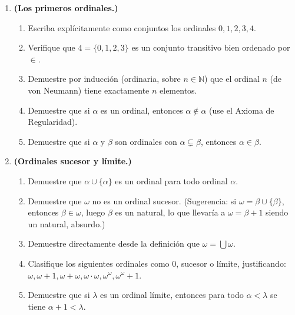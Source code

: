 \begin{enumerate}[leftmargin=2.5em, label=\textbf{\arabic*.}]
  \item \textbf{(Los primeros ordinales.)}
  \begin{enumerate}[label=(\alph*)]
    \item Escriba explícitamente como conjuntos los ordinales $0, 1, 2, 3, 4$.
    \item Verifique que $4 = \{0, 1, 2, 3\}$ es un conjunto transitivo bien ordenado por $\in$.
    \item Demuestre por inducción (ordinaria, sobre $n \in \mathbb{N}$) que el ordinal $n$ (de von Neumann) tiene exactamente $n$ elementos.
    \item Demuestre que si $\alpha$ es un ordinal, entonces $\alpha \notin \alpha$ (use el Axioma de Regularidad).
    \item Demuestre que si $\alpha$ y $\beta$ son ordinales con $\alpha \subsetneq \beta$, entonces $\alpha \in \beta$.
  \end{enumerate}

  \item \textbf{(Ordinales sucesor y límite.)}
  \begin{enumerate}[label=(\alph*)]
    \item Demuestre que $\alpha \cup \{\alpha\}$ es un ordinal para todo ordinal $\alpha$.
    \item Demuestre que $\omega$ no es un ordinal sucesor. (Sugerencia: si $\omega = \beta \cup \{\beta\}$, entonces $\beta \in \omega$, luego $\beta$ es un natural, lo que llevaría a $\omega = \beta+1$ siendo un natural, absurdo.)
    \item Demuestre directamente desde la definición que $\omega = \bigcup \omega$.
    \item Clasifique los siguientes ordinales como $0$, sucesor o límite, justificando: $\omega, \omega+1, \omega+\omega, \omega\cdot\omega, \omega^{\omega}, \omega^{\omega}+1$.
    \item Demuestre que si $\lambda$ es un ordinal límite, entonces para todo $\alpha < \lambda$ se tiene $\alpha + 1 < \lambda$.
  \end{enumerate}


\end{enumerate}
